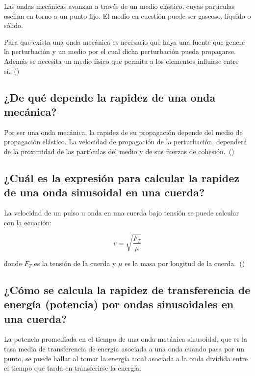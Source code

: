 \documentclass[twocolumn, 12pt]{article}
\begin{document}
Las ondas mecánicas avanzan a través de un medio elástico,
cuyas partículas oscilan en torno a un punto fijo. El medio
en cuestión puede ser gaseoso, líquido o sólido.

Para que exista una onda mecánica es necesario que haya una
fuente que genere la perturbación y un medio por el cual
dicha perturbación pueda propagarse. Además se necesita un
medio físico que permita a los elementos influirse entre
sí.~(\cite{J_Merino_2022})

\subsection{¿De qué depende la rapidez de una onda mecánica?}

Por ser una onda mecánica, la rapidez de su propagación
depende del medio de propagación elástico. La velocidad de
propagación de la perturbación, dependerá de la proximidad
de las partículas del medio y de sus fuerzas de
cohesión.~(\cite{Lasondas})

\subsection{¿Cuál es la expresión para calcular la rapidez de una onda sinusoidal en una cuerda?}

La velocidad de un pulso u onda en una cuerda bajo tensión
se puede calcular con la ecuación:

\begin{equation*}
    v = \sqrt{\frac{F_T}{\mu}}
\end{equation*}

donde $F_T$ es la tensión de la cuerda y $\mu$ es la masa
por longitud de la cuerda.~(\cite{Moebs_2021})

\subsection{¿Cómo se calcula la rapidez de transferencia de energía (potencia) por ondas sinusoidales en
    una cuerda?}

La potencia promediada en el tiempo de una onda mecánica
sinusoidal, que es la tasa media de transferencia de
energía asociada a una onda cuando pasa por un punto, se
puede hallar al tomar la energía total asociada a la onda
dividida entre el tiempo que tarda en transferirse la
energía.
\end{document}
